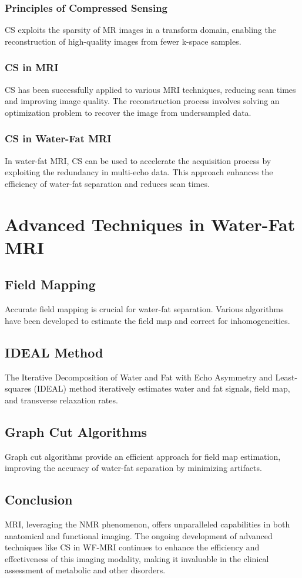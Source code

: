\subsection{Principles of Compressed Sensing}
CS exploits the sparsity of MR images in a transform domain, enabling the reconstruction of high-quality images from fewer k-space samples.

\subsection{CS in MRI}
CS has been successfully applied to various MRI techniques, reducing scan times and improving image quality. The reconstruction process involves solving an optimization problem to recover the image from undersampled data.

\subsection{CS in Water-Fat MRI}
In water-fat MRI, CS can be used to accelerate the acquisition process by exploiting the redundancy in multi-echo data. This approach enhances the efficiency of water-fat separation and reduces scan times.

\chapter{Advanced Techniques in Water-Fat MRI}

\section{Field Mapping}
Accurate field mapping is crucial for water-fat separation. Various algorithms have been developed to estimate the field map and correct for inhomogeneities.

\section{IDEAL Method}
The Iterative Decomposition of Water and Fat with Echo Asymmetry and Least-squares (IDEAL) method iteratively estimates water and fat signals, field map, and transverse relaxation rates.

\section{Graph Cut Algorithms}
Graph cut algorithms provide an efficient approach for field map estimation, improving the accuracy of water-fat separation by minimizing artifacts.

\section{Conclusion}
MRI, leveraging the NMR phenomenon, offers unparalleled capabilities in both anatomical and functional imaging. The ongoing development of advanced techniques like CS in WF-MRI continues to enhance the efficiency and effectiveness of this imaging modality, making it invaluable in the clinical assessment of metabolic and other disorders.